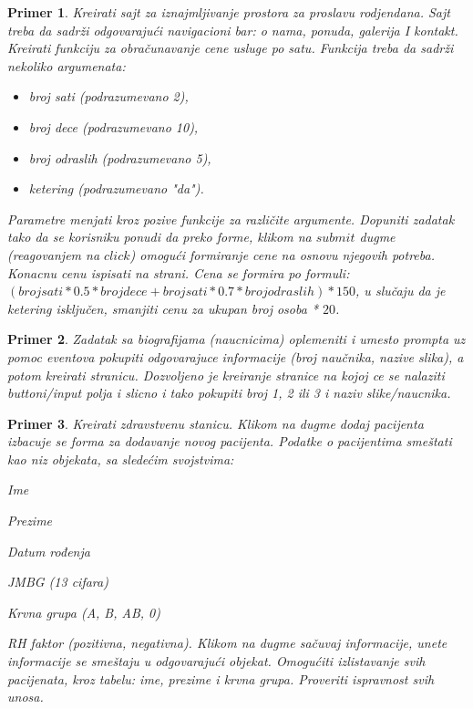 \documentclass[a4paper]{article}
\newtheorem{primer}{Primer}[section]
\begin{document}
\begin{primer}
Kreirati sajt za iznajmljivanje prostora za proslavu rodjendana. Sajt treba da sadrži odgovarajući
 navigacioni bar: o nama, ponuda, galerija I kontakt. 
 Kreirati funkciju za obračunavanje cene usluge po satu. 
 Funkcija treba da sadrži nekoliko argumenata:
\begin{itemize}
 \item broj sati (podrazumevano 2), 
 \item broj dece (podrazumevano 10),
 \item broj odraslih (podrazumevano 5),
 \item ketering (podrazumevano "da"). 
\end{itemize}  
Parametre menjati kroz pozive funkcije za različite argumente. Dopuniti zadatak tako da se korisniku
ponudi da preko forme, klikom na $submit$ dugme (reagovanjem na $click$) omogući formiranje cene 
na osnovu njegovih potreba. Konacnu cenu ispisati na strani.  
Cena se formira po formuli:
     $(brojsati*0.5*brojdece + brojsati*0.7*brojodraslih) *150$, 
u slučaju da je ketering isključen, smanjiti cenu za ukupan broj osoba * $20$. 
\end{primer}

\begin{primer}
Zadatak sa biografijama (naucnicima) oplemeniti i umesto prompta uz pomoc eventova
pokupiti odgovarajuce informacije (broj naučnika, nazive slika), a potom kreirati stranicu. Dozvoljeno je kreiranje stranice na kojoj ce se nalaziti buttoni/input polja i slicno i tako pokupiti broj 1, 2 ili 3 i naziv slike/naucnika.
\end{primer}

\begin{primer}
Kreirati zdravstvenu stanicu. Klikom na dugme dodaj pacijenta izbacuje se forma za dodavanje novog pacijenta. Podatke o pacijentima smeštati kao niz objekata, sa sledećim svojstvima:
\item Ime
\item Prezime
\item Datum rođenja
\item JMBG (13 cifara)
\item Krvna grupa (A, B, AB, 0)
\item RH faktor (pozitivna, negativna).
Klikom na dugme sačuvaj informacije, unete informacije se smeštaju u odgovarajući 
objekat. Omogućiti izlistavanje svih pacijenata, kroz tabelu: ime, prezime i krvna grupa.
Proveriti ispravnost svih unosa.
\end{primer}
\end{document}
